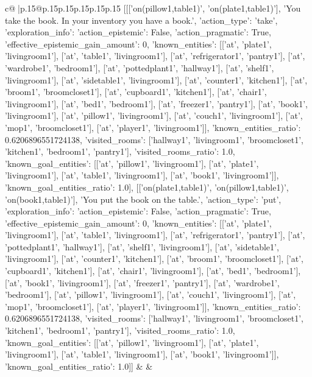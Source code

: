 \documentclass{article}
\begin{document}
{\begin{supertabular}{c@{$\;$}|p{.15\linewidth}@{}p{.15\linewidth}p{.15\linewidth}p{.15\linewidth}p{.15\linewidth}p{.15\linewidth}}
{{{	 [[['on(pillow1,table1)', 'on(plate1,table1)'], 'You take the book. In your inventory you have a book.', {'action_type': 'take', 'exploration_info': {'action_epistemic': False, 'action_pragmatic': True, 'effective_epistemic_gain_amount': 0, 'known_entities': [['at', 'plate1', 'livingroom1'], ['at', 'table1', 'livingroom1'], ['at', 'refrigerator1', 'pantry1'], ['at', 'wardrobe1', 'bedroom1'], ['at', 'pottedplant1', 'hallway1'], ['at', 'shelf1', 'livingroom1'], ['at', 'sidetable1', 'livingroom1'], ['at', 'counter1', 'kitchen1'], ['at', 'broom1', 'broomcloset1'], ['at', 'cupboard1', 'kitchen1'], ['at', 'chair1', 'livingroom1'], ['at', 'bed1', 'bedroom1'], ['at', 'freezer1', 'pantry1'], ['at', 'book1', 'livingroom1'], ['at', 'pillow1', 'livingroom1'], ['at', 'couch1', 'livingroom1'], ['at', 'mop1', 'broomcloset1'], ['at', 'player1', 'livingroom1']], 'known_entities_ratio': 0.6206896551724138, 'visited_rooms': ['hallway1', 'livingroom1', 'broomcloset1', 'kitchen1', 'bedroom1', 'pantry1'], 'visited_rooms_ratio': 1.0, 'known_goal_entities': [['at', 'pillow1', 'livingroom1'], ['at', 'plate1', 'livingroom1'], ['at', 'table1', 'livingroom1'], ['at', 'book1', 'livingroom1']], 'known_goal_entities_ratio': 1.0}}], [['on(plate1,table1)', 'on(pillow1,table1)', 'on(book1,table1)'], 'You put the book on the table.', {'action_type': 'put', 'exploration_info': {'action_epistemic': False, 'action_pragmatic': True, 'effective_epistemic_gain_amount': 0, 'known_entities': [['at', 'plate1', 'livingroom1'], ['at', 'table1', 'livingroom1'], ['at', 'refrigerator1', 'pantry1'], ['at', 'pottedplant1', 'hallway1'], ['at', 'shelf1', 'livingroom1'], ['at', 'sidetable1', 'livingroom1'], ['at', 'counter1', 'kitchen1'], ['at', 'broom1', 'broomcloset1'], ['at', 'cupboard1', 'kitchen1'], ['at', 'chair1', 'livingroom1'], ['at', 'bed1', 'bedroom1'], ['at', 'book1', 'livingroom1'], ['at', 'freezer1', 'pantry1'], ['at', 'wardrobe1', 'bedroom1'], ['at', 'pillow1', 'livingroom1'], ['at', 'couch1', 'livingroom1'], ['at', 'mop1', 'broomcloset1'], ['at', 'player1', 'livingroom1']], 'known_entities_ratio': 0.6206896551724138, 'visited_rooms': ['hallway1', 'livingroom1', 'broomcloset1', 'kitchen1', 'bedroom1', 'pantry1'], 'visited_rooms_ratio': 1.0, 'known_goal_entities': [['at', 'pillow1', 'livingroom1'], ['at', 'plate1', 'livingroom1'], ['at', 'table1', 'livingroom1'], ['at', 'book1', 'livingroom1']], 'known_goal_entities_ratio': 1.0}}]] 
	  } 
	   } 
	   } 
	 & & \\ 
 

    \theutterance {}  


\end{supertabular}}
\end{document}
